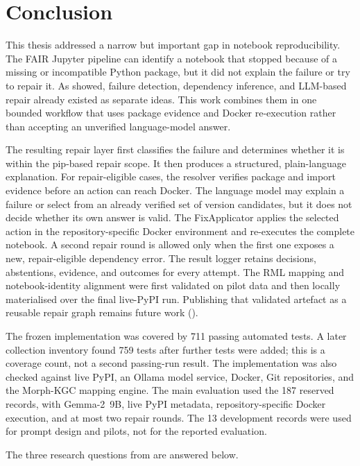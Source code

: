 \chapter{Conclusion}
\label{chap:conclusion}

This thesis addressed a narrow but important gap in notebook reproducibility.
The FAIR Jupyter pipeline can identify a notebook that stopped because of a
missing or incompatible Python package, but it did not explain the failure or
try to repair it. As  showed, failure detection,
dependency inference, and LLM-based repair already existed as separate ideas.
This work combines them in one bounded workflow that uses package evidence and
Docker re-execution rather than accepting an unverified language-model answer.

The resulting repair layer first classifies the failure and determines whether
it is within the pip-based repair scope. It then produces a structured,
plain-language explanation. For repair-eligible cases, the resolver verifies
package and import evidence before an action can reach Docker. The language
model may explain a failure or select from an already verified set of version
candidates, but it does not decide whether its own answer is valid. The
FixApplicator applies the selected action in the repository-specific Docker
environment and re-executes the complete notebook. A second repair round is
allowed only when the first one exposes a new, repair-eligible dependency
error. The result logger retains decisions, abstentions, evidence, and outcomes
for every attempt. The RML mapping and notebook-identity alignment were first
validated on pilot data and then locally materialised over the final live-PyPI
run. Publishing that validated artefact as a reusable repair graph remains
future work ().

The frozen implementation was covered by 711 passing automated tests. A later
collection inventory found 759 tests after further tests were added; this is a
coverage count, not a second passing-run result. The implementation was also
checked against live PyPI, an Ollama model service, Docker, Git repositories,
and the Morph-KGC mapping engine. The main evaluation used the 187 reserved records,
with Gemma-2~9B, live PyPI metadata, repository-specific Docker execution, and
at most two repair rounds. The 13 development records were used for prompt
design and pilots, not for the reported evaluation.

The three research questions from  are answered below.

